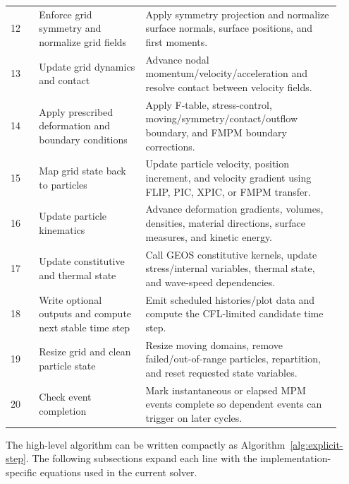\begin{longtable}{@{}p{0.08\linewidth}p{0.30\linewidth}p{0.55\linewidth}@{}}
12 & Enforce grid symmetry and normalize grid fields & Apply symmetry projection and normalize surface normals, surface positions, and first moments.\\
13 & Update grid dynamics and contact & Advance nodal momentum/velocity/acceleration and resolve contact between velocity fields.\\
14 & Apply prescribed deformation and boundary conditions & Apply F-table, stress-control, moving/symmetry/contact/outflow boundary, and FMPM boundary corrections.\\
15 & Map grid state back to particles & Update particle velocity, position increment, and velocity gradient using FLIP, PIC, XPIC, or FMPM transfer.\\
16 & Update particle kinematics & Advance deformation gradients, volumes, densities, material directions, surface measures, and kinetic energy.\\
17 & Update constitutive and thermal state & Call GEOS constitutive kernels, update stress/internal variables, thermal state, and wave-speed dependencies.\\
18 & Write optional outputs and compute next stable time step & Emit scheduled histories/plot data and compute the CFL-limited candidate time step.\\
19 & Resize grid and clean particle state & Resize moving domains, remove failed/out-of-range particles, repartition, and reset requested state variables.\\
20 & Check event completion & Mark instantaneous or elapsed MPM events complete so dependent events can trigger on later cycles.\\
\bottomrule
\end{longtable}

The high-level algorithm can be written compactly as Algorithm~\ref{alg:explicit-step}.  The following subsections expand each line with the implementation-specific equations used in the current solver.

